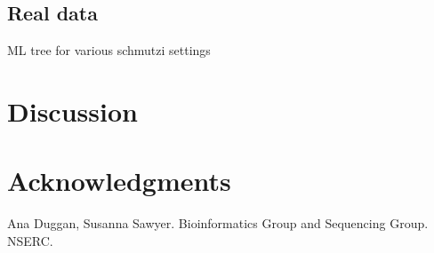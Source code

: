 \documentclass[a4paper,12pt]{article}
\begin{document}

\subsection{Real data}

ML tree for various schmutzi settings

\section{Discussion}

\section{Acknowledgments}

Ana Duggan, Susanna Sawyer. Bioinformatics Group and Sequencing Group. NSERC.

{}

\end{document}
